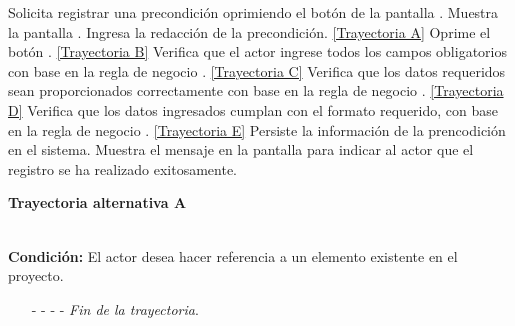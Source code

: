 	\begin{UCtrayectoria}
		\UCpaso[\UCactor] Solicita registrar una precondición oprimiendo el botón  de la pantalla .
		\UCpaso[\UCsist] Muestra la pantalla .
		\UCpaso[\UCactor] Ingresa la redacción de la precondición. \hyperlink{CU12-1-2-1:TAA}{[Trayectoria A]} \label{CU12.1.2-P3}
		\UCpaso[\UCactor] Oprime el botón . \hyperlink{CU12-1-2-1:TAB}{[Trayectoria B]} 
		\UCpaso[\UCsist] Verifica que el actor ingrese todos los campos obligatorios con base en la regla de negocio . \hyperlink{CU12-1-2-1:TAC}{[Trayectoria C]}
		\UCpaso[\UCsist] Verifica que los datos requeridos sean proporcionados correctamente con base en la regla de negocio . \hyperlink{CU12-1-2-1:TAD}{[Trayectoria D]}
		\UCpaso[\UCsist] Verifica que los datos ingresados cumplan con el formato requerido, con base en la regla de negocio . \hyperlink{CU12-1-2-1:TAE}{[Trayectoria E]}
		\UCpaso[\UCsist] Persiste la información de la prencodición en el sistema.
		\UCpaso[\UCsist] Muestra el mensaje  en la pantalla  para indicar al actor que el registro se ha realizado exitosamente.
	\end{UCtrayectoria}		
\hypertarget{CU12-1-2-1:TAA}{\textbf{Trayectoria alternativa A}}\\
\noindent \textbf{Condición:} El actor desea hacer referencia a un elemento existente en el proyecto.
\begin{enumerate}
	\UCpaso[\UCactor] Ingresa el token correspondiente al elemento a referenciar.
	\UCpaso[\UCsist] Verifica que los tokens utilizados se encuentren correctamente estructurados, con base en la regla de negocio . 
	\UCpaso[\UCsist] Obtiene los \hyperlink{tElemento}{elementos} registrados en el proyecto correspondientes al token ingresado. 
	\UCpaso[\UCsist] Muestra una lista con los \hyperlink{tElemento}{elementos} encontrados.
	\UCpaso[\UCactor] Selecciona un elemento de la lista.
	\UCpaso[\UCsist] Verifica que el nombre del elemento seleccionado no contenga espacios. \hyperlink{CU12-1-2-1:TAF}{[Trayectoria F]}
	\UCpaso[\UCsist] Agrega la referencia del elemento al texto. \label{CU12.1.2-TA1}
	\UCpaso Continúa en el paso \ref{CU12.1.2-P3} de la trayectoria principal.
	\item[- -] - - {\em {Fin de la trayectoria}}.%
\end{enumerate}

